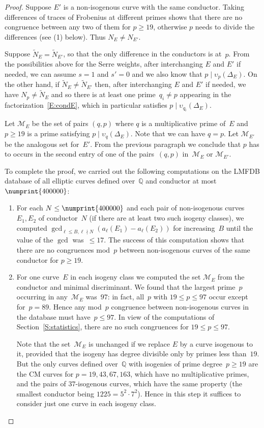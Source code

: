 \documentclass[12pt, reqno]{amsart}
\newcommand{\Q}{\mathbb{Q}}
\newcommand{\calM}{\mathcal{M}}
\newcommand{\vv}{\upsilon}
\numberwithin{equation}{section}
\theoremstyle{definition}
\theoremstyle{remark}
\begin{document}
\begin{proof}
Suppose $E'$ is a non-isogenous curve with the same conductor. Taking differences of traces of Frobenius at different primes shows that 
there are no congruence between any two of them for $p \geq 19$, otherwise $p$ needs to divide the differences (see (1) below). 
Thus $N_E \neq N_{E'}$.

Suppose $\tilde{N}_E = \tilde{N}_{E'}$, so that the only difference in the conductors is at~$p$. From the possibilities above for the Serre weights, after interchanging $E$ and $E'$ if needed, 
we can assume $s=1$ and $s'=0$ and we also know that $p \mid \vv_p(\Delta_E)$. On the other hand, if $\tilde{N}_E \neq \tilde{N}_{E'}$ then, after interchanging $E$ and $E'$ if needed, we have $N_p \neq \tilde{N}_E$ and so there is at least one prime~$q_i \neq p$ appearing in the factorization~\eqref{E:condE}, which in particular satisfies $p \mid \vv_{q_i}(\Delta_E)$.

Let $\calM_E$ be the set of pairs $(q,p)$ where $q$ is a multiplicative prime of~$E$ and
$p \geq 19$ is a prime satisfying $p \mid \vv_{q}(\Delta_E)$.
Note that we can have $q=p$. Let $\calM_{E'}$ be the analogous set for~$E'$. From the previous paragraph we conclude that 
$p$ has to occurs in the second entry of one of the pairs~$(q,p)$ in~$\calM_E$ or $\calM_{E'}$.

To complete the proof, we carried out the following computations on
the LMFDB database of all elliptic curves defined over~$\Q$ and
conductor at most~$\numprint{400000}$:
\begin{enumerate}
\item For each $N\le \numprint{400000}$ and each pair of non-isogenous
  curves~$E_1,E_2$ of conductor~$N$ (if there are at least two such
  isogeny classes), we computed $\gcd_{\ell\le B,
    \ell\nmid N}(a_{\ell}(E_1)-a_{\ell}(E_2))$ for increasing~$B$
  until the value of the $\gcd$ was~${}\le17$.  The success of this
  computation shows that there are no congruences mod~$p$ between
  non-isogenous curves of the same conductor for $p\ge19$.
\item For one curve~$E$ in each isogeny class we computed the set
  $\calM_E$ from the conductor and minimal discriminant.  We found that
  the largest prime~$p$ occurring in any~$\calM_E$ was~$97$: in fact,
  all~$p$ with $19\le p\le97$ occur except for~$p=89$.  Hence any
  mod~$p$ congruence between non-isogenous curves in the database must
  have~$p\le97$.  In view of the computations of
  Section~\ref{S:statistics}, there are no such congruences for $19\le
  p\le97$.

  Note that the set~$\calM_E$ is unchanged if we replace $E$ by a curve
  isogenous to it, provided that the isogeny has degree divisible only
  by primes less than~$19$.  But the only curves defined over~$\Q$ with
  isogenies of prime degree~$p\ge19$ are the CM curves for
  $p=19,43,67,163$, which have no multiplicative primes, and the pairs
  of $37$-isogenous curves, which have the same property (the smallest
  conductor being $1225=5^2\cdot7^2$).  Hence in this step it suffices
  to consider just one curve in each isogeny class.
\end{enumerate}
\end{proof}
\end{document}
